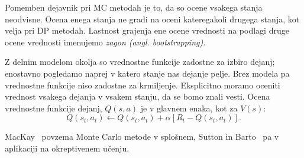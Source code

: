 \documentclass[a4paper, oneside, 12pt]{report}
\begin{document}
Pomemben dejavnik pri MC metodah je to, da so ocene vsakega stanja neodvisne. Ocena enega stanja ne gradi na oceni kateregakoli drugega stanja, kot velja pri DP metodah. Lastnost grajenja ene ocene vrednosti na podlagi druge ocene vrednosti imenujemo {\em zagon (angl. bootstrapping)}.



Z delnim modelom okolja so vrednostne funkcije zadostne za izbiro dejanj; enostavno pogledamo naprej v katero stanje nas dejanje pelje. Brez modela pa vrednostne funkcije niso zadostne za krmiljenje. Eksplicitno moramo oceniti vrednost vsakega dejanja v vsakem stanju, da se bomo znali vesti. Ocena vrednostne funkcije dejanj, $Q(s,a)$ je v glavnem enaka, kot za $V(s)$:
\begin{equation}
Q(s_t, a_t) \gets Q(s_t, a_t) + \alpha[R_t - Q(s_t, a_t)].
\end{equation}

MacKay~\cite{IntroductionToMonteCarloMethods} povzema Monte Carlo metode v splošnem, Sutton in Barto~\cite{ReinforcementLearningAnIntroduction} pa v aplikaciji na okreptivenem učenju.
\end{document}
